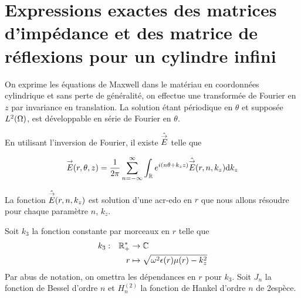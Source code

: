 \section{Expressions exactes des matrices d'impédance et des matrice de réflexions pour un cylindre infini}


  \begin{figure}[!hbt]
    \centering
    \begin{tikzpicture}
      
    \end{tikzpicture}
  \end{figure}

  On exprime les équations de Maxwell dans le matériau en coordonnées cylindrique et sans perte de généralité, on effectue une transformée de Fourier en \(z\) par invariance en translation.
  La solution étant périodique en \(\theta\) et supposée \(L^2(\OO)\), est développable en série de Fourier en \(\theta\).

  En utilisant l'inversion de Fourier, il existe \(\hat\vE\) telle que

  \begin{equation}
    \vE(r,\theta,z) = \frac{1}{2\pi}\sum_{n=-\infty}^{\infty}\int_{\RR} e^{i(n \theta + k_z z )}\hat{\vE} (r,n,k_z) \dd{k_z}
  \end{equation}

  La fonction \(\hat{\vE} (r,n,k_z)\) est solution d'une \gls{acr-edo} en \(r\) que nous allons résoudre pour chaque paramètre \(n\), \(k_z\).

  \begin{defn}
    Soit \(k_3\) la fonction constante par morceaux en \(r\) telle que
    \begin{equation*}
      \fonction{k_3}{\RR_+^*}{\CC}
      {r}{\sqrt{\w^2\eps(r)\mu(r) - k_z^2}}
    \end{equation*}
    Par abus de notation, on omettra les dépendances en \(r\) pour \(k_3\).
    Soit \(J_n\) la fonction de Bessel d'ordre \(n\) et \(H_n^{(2)}\) la fonction de Hankel d'ordre \(n\) de 2\ieme espèce.
  \end{defn}

